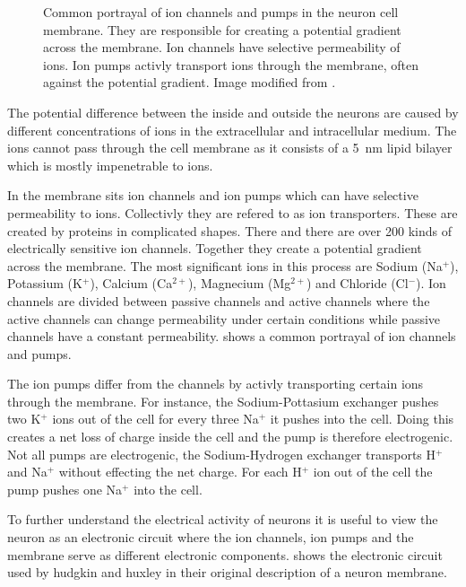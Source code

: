 \documentclass[altfont, fleqn]{uiophd}
\renewcommand{\Cref}[1]{{\color{viridis_03}\myCref{#1}}}
\begin{document}
\begin{figure}[h]
    \caption{
        Common portrayal of ion channels and pumps in the neuron cell membrane. 
        They are responsible for
        creating a potential gradient across the membrane. 
        Ion channels have
        selective permeability of ions. Ion pumps activly transport ions
        through the membrane, often against the potential gradient. 
        Image modified from 
        \textcites{sterratt_principles_2011}.
    }
    \label{fig:2_ion_channels}
\end{figure}
The potential difference between the inside and outside the neurons 
are caused by different concentrations of 
ions
in the extracellular and intracellular medium. 
The ions cannot pass through 
the cell membrane as it
consists of a \SI{5}{\nano\metre} lipid bilayer which is mostly impenetrable 
to ions. 

In the membrane sits ion channels and 
ion pumps which can have selective permeability to ions. 
Collectivly they are refered to as ion transporters. 
These are created by proteins in complicated shapes. 
There and there are over 200 
kinds of electrically sensitive ion channels.
Together they create a 
potential gradient across the membrane. 
The most significant ions in this process are Sodium (Na$^+$), Potassium (K$^+$), 
Calcium (Ca$^{2+}$), Magnecium (Mg$^{2+}$) and Chloride (Cl$^{-}$). 
Ion channels are divided between passive channels and 
active channels where the active channels can change 
permeability under certain conditions while passive channels have a constant
permeability. 
\Cref{fig:2_ion_channels} shows a common portrayal of ion channels and pumps. 

The ion pumps differ from the channels by activly transporting certain
ions through the membrane. 
For instance, the Sodium-Pottasium exchanger pushes two K$^+$ ions out of the cell
for every three Na$^+$ it pushes into the cell. Doing this creates a net 
loss of charge inside the cell and the pump is therefore electrogenic. 
Not all pumps are electrogenic, the Sodium-Hydrogen exchanger transports
H$^+$ and Na$^+$ without effecting the net charge.
For each H$^+$ ion out of the cell the pump pushes one Na$^+$
into the cell. 

To further understand the electrical activity of neurons it is useful
to view the neuron as an electronic circuit where the ion channels, ion pumps
and the membrane serve as different electronic components.
\Cref{fig:2_hud_hux} shows the electronic circuit used by hudgkin
and huxley in their original description of a neuron membrane. 
\textcites{hodgkin_quantitative_1952, sterratt_principles_2011}
\end{document}
